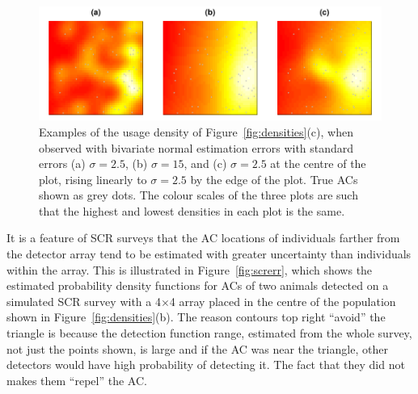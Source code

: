 \documentclass[10pt,a4paper]{article}
\begin{document}
\begin{figure}[htbp]
\centering
\includegraphics[width=\textwidth]{acuseesterr.pdf}
\caption{Examples of the usage density of Figure~\ref{fig:densities}(c), when observed with bivariate normal estimation errors with standard errors (a) $\sigma=2.5$, (b) $\sigma=15$, and (c) $\sigma=2.5$ at the centre of the plot, rising linearly to $\sigma=2.5$ by the edge of the plot. True ACs shown as grey dots. The colour scales of the three plots are such that the highest and lowest densities in each plot is the same.}
\label{fig:acuseesterr}
\end{figure}

It is a feature of SCR surveys that the AC locations of individuals farther from the detector array tend to be estimated with greater uncertainty than individuals within the array. This is illustrated in Figure~\ref{fig:screrr}, which shows the estimated probability density functions for ACs of two animals detected on a simulated SCR survey with a 4$\times$4 array placed in the centre of the population shown in Figure~\ref{fig:densities}(b). The reason contours top right ``avoid'' the triangle is because the detection function range, estimated from the whole survey, not just the points shown, is large and if the AC was near the triangle, other detectors would have high probability of detecting it. The fact that they did not makes them ``repel'' the AC. %
\end{document}
